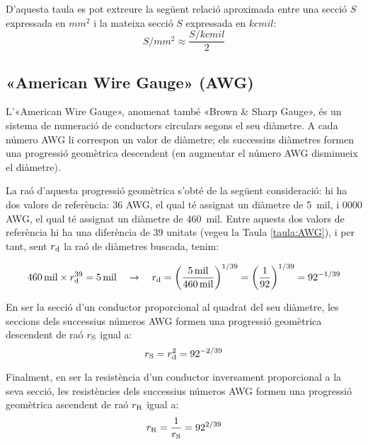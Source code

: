 D'aquesta taula es pot extreure la següent relació aproximada entre una secció $S$ expressada en $\si{mm^2}$ i la mateixa secció $S$ expressada en $\si{kcmil}$:
\begin{equation}
  S/{\scriptstyle\si{mm^2}} \approx \frac{ S/{\scriptstyle\si{kcmil}}}{2}
\end{equation}



\subsection{«American Wire Gauge» (AWG)}\label{sec:awg}

L'«American Wire Gauge», anomenat també «Brown \& Sharp Gauge», és un sistema de numeració de conductors circulars segons el seu diàmetre. A cada número AWG li correspon un valor de diàmetre; els successius diàmetres formen una progressió geomètrica descendent (en augmentar el número AWG disminueix el diàmetre).

La raó d'aquesta progressió geomètrica s'obté de la següent consideració: hi ha dos valors de referència: 36 AWG, el qual té assignat un diàmetre de \SI{5}{mil}, i 0000 AWG, el qual té assignat un diàmetre de \SI{460}{mil}. Entre aquests dos valors de referència hi ha una diferència de 39 unitats (vegeu la Taula \vref{taula:AWG}), i per tant, sent $r_\mathrm{d}$ la raó de diàmetres buscada, tenim:

\begin{equation}
   \SI{460}{mil} \times r_\mathrm{d}^{39} = \SI{5}{mil} \quad \rightarrow \quad r_\mathrm{d} = \left( \frac{\SI{5}{mil}}{\SI{460}{mil}} \right)^{1/39} = \left( \frac{1}{92} \right)^{1/39} = 92^{-1/39}
\end{equation}

En ser la secció d'un conductor proporcional al quadrat del seu diàmetre, les seccions dels successius números AWG formen una progressió geomètrica  descendent de raó $r_\mathrm{S}$ igual a: \begin{equation}
   r_\mathrm{S} = r_\mathrm{d}^2 = 92^{-2/39}
\end{equation}

Finalment, en ser la resistència d'un conductor inversament proporcional a la seva secció, les resistències dels successius números AWG formen una progressió geomètrica ascendent de raó $r_\mathrm{R}$ igual a:
\begin{equation}
   r_\mathrm{R} = \frac{1}{r_\mathrm{S}} = 92^{2/39}
\end{equation}

